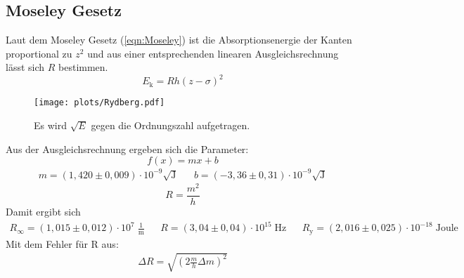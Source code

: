 \subsection{Moseley Gesetz}
Laut dem Moseley Gesetz (\ref{eqn:Moseley}) ist die Absorptionsenergie der Kanten proportional zu $z^2$ und aus einer entsprechenden linearen Ausgleichsrechnung lässt sich $R$ bestimmen.
\begin{equation}
    E_{\text{k}}= Rh\left(z-\sigma\right)^2 \label{eqn:Moseley}
\end{equation}
\begin{figure}
    \centering
    \texttt{[image: plots/Rydberg.pdf]}
    \caption{Es wird $\sqrt{E}$ gegen die Ordnungszahl aufgetragen.}
    \label{fig:Moseley}
\end{figure}
Aus der Ausgleichsrechnung ergeben sich die Parameter:
\begin{equation*}
    f(x) = mx+b
\end{equation*}
\begin{align*}
    m = (1,420 \pm 0,009)\cdot 10^{-9} \sqrt{\text{J}} && b = (-3,36 \pm 0,31)\cdot 10^{-9} \sqrt{\text{J}}
\end{align*}
\begin{equation*}
    R = \frac{m^2}{h}
\end{equation*}
Damit ergibt sich 
\begin{align*}
    R_{\infty} = (1,015\pm0,012) \cdot 10^{7} \; \frac{1}{\text{m}}&& R = (3,04\pm0,04)\cdot 10^{15} \; \text{Hz} && R_{\text{y}} = (2,016 \pm 0,025)\cdot 10^{-18} \; \text{Joule}
\end{align*}
Mit dem Fehler für R aus:
\begin{align*}
    \Delta R = \sqrt{\left( 2\frac{m}{h} \Delta m\right)^2}
\end{align*}